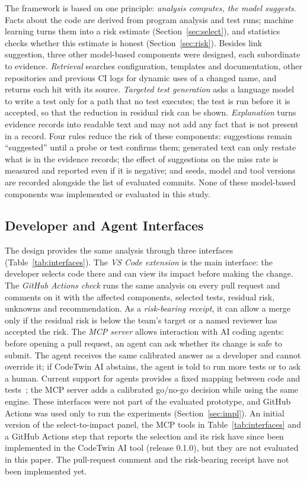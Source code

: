 \documentclass[conference]{IEEEtran}
\begin{document}
The framework is based on one principle: \emph{analysis computes, the model suggests}. Facts about the code are derived from program analysis and test runs; machine learning turns them into a risk estimate (Section~\ref{sec:select}), and statistics checks whether this estimate is honest (Section~\ref{sec:risk}). Besides link suggestion, three other model-based components were designed, each subordinate to evidence. \emph{Retrieval} searches configuration, templates and documentation, other repositories and previous CI logs for dynamic uses of a changed name, and returns each hit with its source. \emph{Targeted test generation} asks a language model to write a test only for a path that no test executes; the test is run before it is accepted, so that the reduction in residual risk can be shown. \emph{Explanation} turns evidence records into readable text and may not add any fact that is not present in a record. Four rules reduce the risk of these components: suggestions remain ``suggested'' until a probe or test confirms them; generated text can only restate what is in the evidence records; the effect of suggestions on the miss rate is measured and reported even if it is negative; and seeds, model and tool versions are recorded alongside the list of evaluated commits. None of these model-based components was implemented or evaluated in this study.

\subsection{Developer and Agent Interfaces}
The design provides the same analysis through three interfaces (Table~\ref{tab:interfaces}). The \emph{VS Code extension} is the main interface: the developer selects code there and can view its impact before making the change. The \emph{GitHub Actions check} runs the same analysis on every pull request and comments on it with the affected components, selected tests, residual risk, unknowns and recommendation. As a \emph{risk-bearing receipt}, it can allow a merge only if the residual risk is below the team's target or a named reviewer has accepted the risk. The \emph{MCP server} allows interaction with AI coding agents: before opening a pull request, an agent can ask whether its change is safe to submit. The agent receives the same calibrated answer as a developer and cannot override it; if CodeTwin AI abstains, the agent is told to run more tests or to ask a human. Current support for agents provides a fixed mapping between code and tests~\cite{alonso2026tdad}; the MCP server adds a calibrated go/no-go decision while using the same engine. These interfaces were not part of the evaluated prototype, and GitHub Actions was used only to run the experiments (Section~\ref{sec:impl}). An initial version of the select-to-impact panel, the MCP tools in Table~\ref{tab:interfaces} and a GitHub Actions step that reports the selection and its risk have since been implemented in the CodeTwin AI tool (release 0.1.0), but they are not evaluated in this paper. The pull-request comment and the risk-bearing receipt have not been implemented yet.
\end{document}
